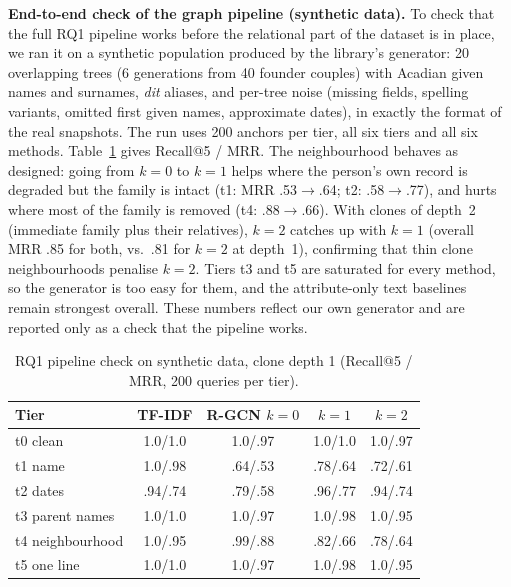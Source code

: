 \textbf{End-to-end check of the graph pipeline (synthetic data).}
To check that the full RQ1 pipeline works before the relational part of the dataset is in place, we ran it on a synthetic population produced by the library's generator: 20 overlapping trees (6 generations from 40 founder couples) with Acadian given names and surnames, \textit{dit} aliases, and per-tree noise (missing fields, spelling variants, omitted first given names, approximate dates), in exactly the format of the real snapshots. The run uses 200 anchors per tier, all six tiers and all six methods. Table~\ref{tab:synth} gives Recall@5 / MRR.
The neighbourhood behaves as designed: going from $k=0$ to $k=1$ helps where the person's own record is degraded but the family is intact (t1: MRR .53$\to$.64; t2: .58$\to$.77), and hurts where most of the family is removed (t4: .88$\to$.66). With clones of depth~2 (immediate family plus their relatives), $k=2$ catches up with $k=1$ (overall MRR .85 for both, vs.\ .81 for $k=2$ at depth~1), confirming that thin clone neighbourhoods penalise $k=2$. Tiers t3 and t5 are saturated for every method, so the generator is too easy for them, and the attribute-only text baselines remain strongest overall. These numbers reflect our own generator and are reported only as a check that the pipeline works.

\begin{table}[h]
\centering
\caption{RQ1 pipeline check on synthetic data, clone depth 1 (Recall@5 / MRR, 200 queries per tier).}
\label{tab:synth}
\setlength{\tabcolsep}{2.5pt}
\begin{tabular}{lcccc}
\hline
Tier & TF-IDF & R-GCN $k=0$ & $k=1$ & $k=2$ \\
\hline
t0 clean & 1.0/1.0 & 1.0/.97 & 1.0/1.0 & 1.0/.97 \\
t1 name & 1.0/.98 & .64/.53 & .78/.64 & .72/.61 \\
t2 dates & .94/.74 & .79/.58 & .96/.77 & .94/.74 \\
t3 parent names & 1.0/1.0 & 1.0/.97 & 1.0/.98 & 1.0/.95 \\
t4 neighbourhood & 1.0/.95 & .99/.88 & .82/.66 & .78/.64 \\
t5 one line & 1.0/1.0 & 1.0/.97 & 1.0/.98 & 1.0/.95 \\
\hline
\end{tabular}
\end{table}

